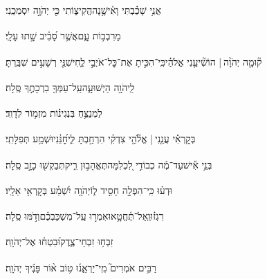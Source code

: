 \documentclass[12pt]{article}
\newcommand{\loc}[1]{\textsuperscript{\locf{#1}}}
\begin{document}
{\loc{ ו}~}‏אֲנִ֥י שָׁכַ֗בְתִּי וָאִ֫ישָׁ֥נָה{\hfill}הֱקִיצ֑וֹתִי כִּ֖י יְהֹוָ֣ה יִסְמְכֵֽנִי׃\par

{\loc{ ז}~}‏ מֵרִבְב֥וֹת עָ֑ם{\hfill}אֲשֶׁ֥ר סָ֝בִ֗יב שָׁ֣תוּ עָלָֽי׃\par

{\loc{ ח}~}‏ק֘וּמָ֤ה יְהֹוָ֨ה | {\hfill}הוֹשִׁ֘יעֵ֤נִי אֱלֹהַ֗י\newline\hspace*{.5em}כִּֽי־הִכִּ֣יתָ אֶת־כׇּל־אֹיְבַ֣י לֶ֑חִי{\hfill}שִׁנֵּ֖י רְשָׁעִ֣ים שִׁבַּֽרְתָּ׃\par

{\loc{ ט}~}‏לַֽיהֹוָ֥ה הַיְשׁוּעָ֑ה{\hfill}עַֽל־עַמְּךָ֖ בִרְכָתֶ֣ךָ סֶּֽלָה׃\par\pend

\pstart[\subsection*{\textcolor{red}{פרק ד}}]\label{פרק ד}
{\loc{ א}~}‏לַמְנַצֵּ֥חַ בִּנְגִינ֗וֹת מִזְמ֥וֹר לְדָוִֽד׃\par

{\loc{ ב}~}‏בְּקׇרְאִ֡י עֲנֵ֤נִי |  אֱלֹ֘הֵ֤י צִדְקִ֗י{\hfill} הִרְחַ֣בְתָּ לִּ֑י\newline\hspace*{.5em}חׇ֝נֵּ֗נִי{\hfill}וּשְׁמַ֥ע תְּפִלָּתִֽי׃\par

{\loc{ ג}~}‏בְּנֵ֥י אִ֡ישׁ{\hfill}עַד־מֶ֬ה כְבוֹדִ֣י לִ֭כְלִמָּה\newline\hspace*{.5em}תֶּאֱהָב֣וּן רִ֑יק{\hfill}תְּבַקְשׁ֖וּ כָזָ֣ב סֶֽלָה׃\par

{\loc{ ד}~}‏וּדְע֗וּ כִּֽי־הִפְלָ֣ה  חָסִ֣יד ל֑וֹ{\hfill}יְהֹוָ֥ה יִ֝שְׁמַ֗ע בְּקׇרְאִ֥י אֵלָֽיו׃\par

{\loc{ ה}~}‏רִגְז֗וּ{\hfill}וְֽאַל־תֶּ֫חֱטָ֥אוּ\newline\hspace*{.5em}אִמְר֣וּ  עַֽל־מִשְׁכַּבְכֶ֗ם{\hfill}וְדֹ֣מּוּ סֶֽלָה׃\par

{\loc{ ו}~}‏זִבְח֥וּ זִבְחֵי־צֶ֑דֶק{\hfill}וּ֝בִטְח֗וּ אֶל־יְהֹוָֽה׃\par

{\loc{ ז}~}‏רַבִּ֥ים אֹמְרִים֮ מִֽי־יַרְאֵ֢נ֫וּ ט֥וֹב{\hfill} א֨וֹר פָּנֶ֬יךָ יְהֹוָֽה׃\par
\end{document}

